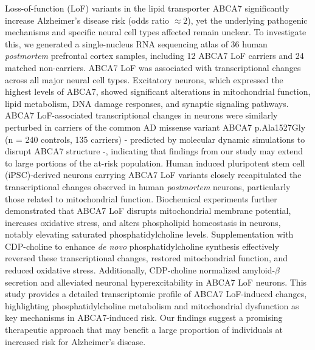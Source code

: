 Loss-of-function (LoF) variants in the lipid transporter ABCA7 significantly increase Alzheimer's disease risk (odds ratio $\approx  2$), yet the underlying pathogenic mechanisms and specific neural cell types affected remain unclear. To investigate this, we generated a single-nucleus RNA sequencing atlas of 36 human \textit{postmortem} prefrontal cortex samples, including 12 ABCA7 LoF carriers and 24 matched non-carriers. ABCA7 LoF was associated with transcriptional changes across all major neural cell types. Excitatory neurons, which expressed the highest levels of ABCA7, showed significant alterations in mitochondrial function, lipid metabolism, DNA damage responses, and synaptic signaling pathways. ABCA7 LoF-associated transcriptional changes in neurons were similarly perturbed in carriers of the common AD missense variant ABCA7 p.Ala1527Gly (n = 240 controls, 135 carriers) - predicted by molecular dynamic simulations to disrupt ABCA7 structure -, indicating that findings from our study may extend to large portions of the at-risk population. Human induced pluripotent stem cell (iPSC)-derived neurons carrying ABCA7 LoF variants closely recapitulated the transcriptional changes observed in human \textit{postmortem} neurons, particularly those related to mitochondrial function. Biochemical experiments further demonstrated that ABCA7 LoF disrupts mitochondrial membrane potential, increases oxidative stress, and alters phospholipid homeostasis in neurons, notably elevating saturated phosphatidylcholine levels. Supplementation with CDP-choline to enhance \textit{de novo} phosphatidylcholine synthesis effectively reversed these transcriptional changes, restored mitochondrial function, and reduced oxidative stress. Additionally, CDP-choline normalized amyloid-$\beta$ secretion and alleviated neuronal hyperexcitability in ABCA7 LoF neurons. This study provides a detailed transcriptomic profile of ABCA7 LoF-induced changes, highlighting phosphatidylcholine metabolism and mitochondrial dysfunction as key mechanisms in ABCA7-induced risk. Our findings suggest a promising therapeutic approach that may benefit a large proportion of individuals at increased risk for Alzheimer's disease.

